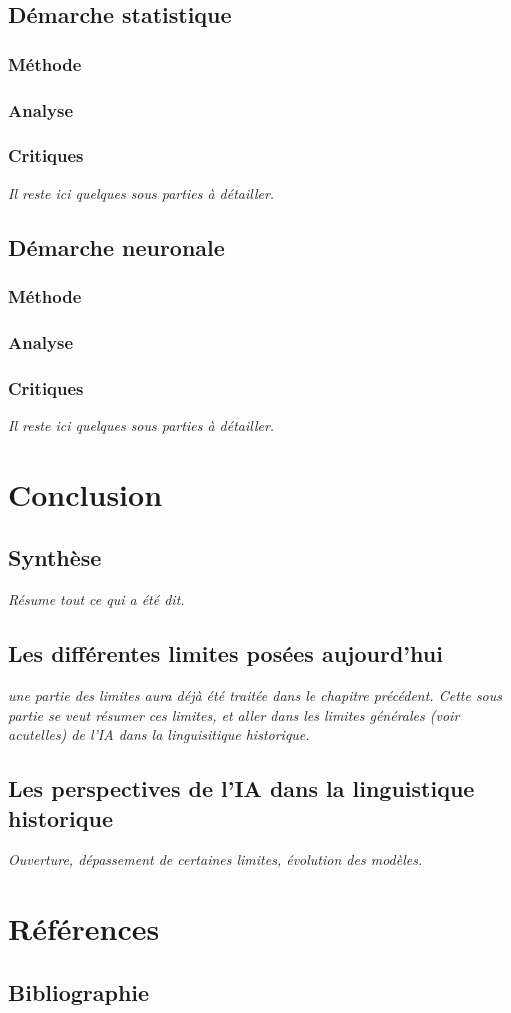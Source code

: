 \documentclass[12pt, letterpaper]{report}
\begin{document}
\section{Démarche statistique}
\subsection{Méthode}
\subsection{Analyse}
\subsection{Critiques}
\textit{Il reste ici quelques sous parties à détailler.}
\section{Démarche neuronale}
\subsection{Méthode}
\subsection{Analyse}
\subsection{Critiques}
\textit{Il reste ici quelques sous parties à détailler.}

\chapter{Conclusion}
\section{Synthèse}
\textit{Résume tout ce qui a été dit.}
\section{Les différentes limites posées aujourd'hui}
\textit{une partie des limites aura déjà été traitée dans le chapitre précédent. Cette sous partie se veut résumer ces limites, et aller dans les limites générales (voir acutelles) de l'IA dans  la linguisitique historique.}
\section{Les perspectives de l'IA dans la linguistique historique}
\textit{Ouverture, dépassement de certaines limites, évolution des modèles.}

\chapter{Références}
\section{Bibliographie}
\end{document}
